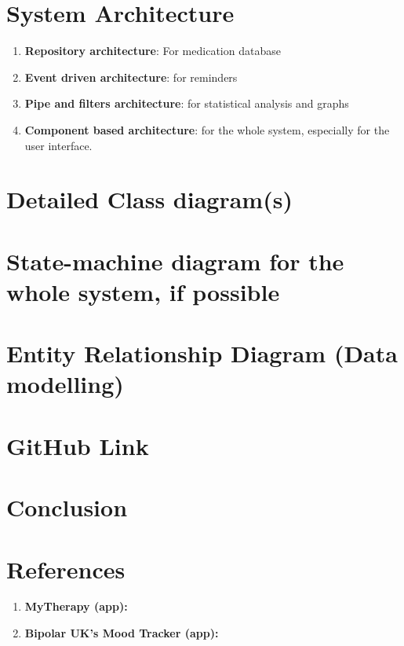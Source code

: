 \documentclass[11pt]{article}
\begin{document}
     \section{System Architecture}\label{sec:system-architecture}

     \begin{enumerate}
         \item \textbf{Repository architecture}: For medication database
         \item \textbf{Event driven architecture}: for reminders
         \item \textbf{Pipe and filters architecture}: for statistical analysis and graphs
         \item \textbf{Component based architecture}: for the whole system, especially for the user interface.
     \end{enumerate}


     \section{Detailed Class diagram(s)}\label{sec:detailed-class-diagram(s)}


     \section{State-machine diagram {for the whole system, if possible}}\label{sec:state-machine-diagram}


     \section{Entity Relationship Diagram (Data modelling)}\label{sec:er--diagram-(data-modelling)}


     \section{GitHub Link}\label{sec:github-link}


     \section{Conclusion}\label{sec:conclusion}


     \section{References}\label{sec:reference}

     \begin{enumerate}
         \item \textbf{MyTherapy (app):} \cite{MyTherapy}
         \item \textbf{Bipolar UK’s Mood Tracker (app):} \cite{BiPolUK}
     \end{enumerate}
\end{document}
